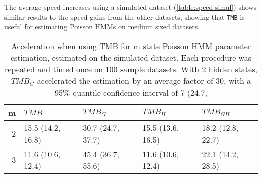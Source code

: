 \documentclass[bimj,fleqn]{w-art}\usepackage[]{graphicx}\usepackage[]{color}
\theoremstyle{plain}
\theoremstyle{definition}
\begin{document}
The average speed increases using a simulated dataset (\autoref{table:speed-simul}) shows similar results to the speed gains from the other datasets, showing that {\tt{TMB}} is useful for estimating Poisson HMMs on medium sized datasets.
\begin{table}[ht]
\centering
\begin{tabular}{rllll}
  \hline
m & \textit{${TMB}$} & \textit{${TMB_G}$} & \textit{${TMB_H}$} & \textit{${TMB_{GH}}$} \\ 
  \hline
2 & 15.5 (14.2, 16.8) & 30.7 (24.7, 37.7) & 15.5 (13.6, 16.5) & 18.2 (12.8, 22.7) \\ 
  3 & 11.6 (10.6, 12.4) & 45.4 (36.7, 55.6) & 11.6 (10.6, 12.4) & 22.1 (14.2, 28.5) \\ 
   \hline
\end{tabular}
\caption{Acceleration when using TMB for m state Poisson HMM parameter estimation, estimated on the simulated dataset. Each procedure was repeated and timed once on 100 sample datasets. With 2 hidden states, $TMB_G$ accelerated the estimation by an average factor of 30, with a 95\% quantile confidence interval of 7 (24.7,} 
\label{table:speed-simu}
\end{table}
\end{document}
